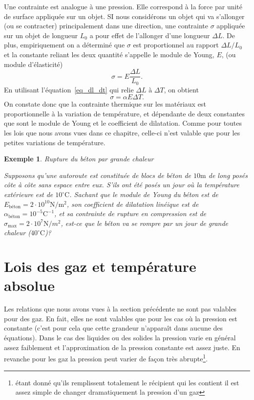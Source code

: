 \documentclass[a4paper,12pt]{book}
\newtheorem*{exemple}{Exemple}
\newcommand{\m}{\mathrm{m}}
\newcommand{\C}{\mathrm{C}}
\newcommand{\N}{\mathrm{N}}
\begin{document}
Une contrainte est analogue à une pression. Elle correspond à la
force par unité de surface appliquée sur un objet.
SI nous considérons un objet qui va s'allonger (ou se contracter) principalement dans une direction, une contrainte $\sigma$ appliquée sur un objet de longueur $L_0$ a pour effet de l'allonger d'une longueur $\Delta L$. De plus, 
empiriquement on a déterminé que $\sigma$ est proportionnel 
au rapport $\Delta L/L_0$ et la constante reliant les deux quantité s'appelle le module de Young, $E$, (ou module d'élasticité)
\begin{equation}
\sigma=E\frac{\Delta L}{L_0}.
\end{equation}
En utilisant l'équation~\eqref{eq_dl_dt} qui relie $\Delta L$ à $\Delta T$, on obtient
\begin{equation}
\sigma=\alpha E \Delta T.
\end{equation}
On constate donc que la contrainte thermique sur les matériaux est proportionnelle à la variation de température, et dépendante 
de deux constantes que sont le module de Young et le coefficient de dilatation. Comme pour toutes les lois que nous avons vues dans ce chapitre, celle-ci n'est valable que pour les petites variations de température.
\begin{exemple}{Rupture du béton par grande chaleur}

Supposons qu'une autoroute est constituée de blocs de béton
de $10\m$ de long posés côte à côte sans espace entre eux. S'ils ont été posés un jour où la température extérieure est de $10^\circ\C$. Sachant que le module de Young du béton est de $E_{\mbox{béton}}=2\cdot10^{10}\N/\m^2$, 
son coefficient de dilatation linéique est de $\alpha_{\mbox{béton}}=10^{-5}\C^{-1}$, et sa contrainte de rupture en compression est de $\sigma_{\mbox{max}}=2\cdot 10^7 \N/m^2$, est-ce que le béton 
va se rompre par un jour de grande chaleur ($40^\circ\C$)?
\end{exemple}

\section{Lois des gaz et température absolue}

Les relations que nous avons vues à la section précédente
ne sont pas valables pour des gaz. En fait, elles ne sont valables que pour les cas où la pression est constante (c'est pour cela que cette grandeur n'apparaît dans aucune des 
équations). Dans le cas des liquides ou des solides la
pression varie en général assez faiblement et l'approximation 
de la pression constante est assez juste. En revanche pour les
gaz la pression peut varier de façon très abrupte\footnote{étant donné qu'ils remplissent totalement le récipient qui les contient il est assez simple de changer dramatiquement la pression d'un gaz}. 
\end{document}
